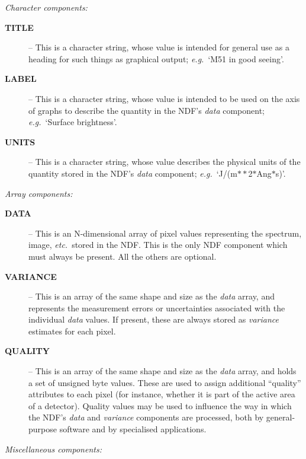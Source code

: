 \documentclass[twoside,11pt]{article}
\newcommand{\st}[1]{{\em{#1}}}
\begin{document}
{\large \st{Character components:}}

\begin{description}

\item[{\bf TITLE}] -- This is a character string, whose value is
intended for general use as a heading for such things as graphical output;
\st{e.g.}\ `M51 in good seeing'. 

\item[{\bf LABEL}] -- This is a character string, whose value is
intended to be used on the axis of graphs to describe the quantity in the
NDF's \st{data\/} component; \st{e.g.}\ `Surface brightness'. 

\item[{\bf UNITS}] -- This is a character string, whose value
describes the physical units of the quantity stored in the NDF's \st{data\/}
component; \st{e.g.}\ `J/(m$**$2$*$Ang$*$s)'. 

\end{description}

{\large \st{Array components:}}

\begin{description}

\item[{\bf DATA}] -- This is an N-dimensional array of pixel values
representing the spectrum, image, \st{etc.}\ stored in the NDF. 
This is the only NDF component which must always be present.
All the others are optional. 

\item[{\bf VARIANCE}] -- This is an array of the same shape and size
as the \st{data\/} array, and represents the measurement errors or
uncertainties associated with the individual \st{data\/} values. 
If present, these are always stored as \st{variance\/} estimates for each
pixel. 

\item[{\bf QUALITY}] -- This is an array of the same shape and size as
the \st{data\/} array, and holds a set of unsigned byte values. 
These are used to assign additional ``quality'' attributes to each pixel
(for instance, whether it is part of the active area of a detector). 
Quality values may be used to influence the way in which the NDF's
\st{data\/} and \st{variance\/} components are processed, both by
general-purpose 
software and by specialised applications. 

\end{description}

{\large \st{Miscellaneous components:}}
\end{document}

